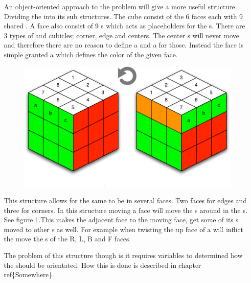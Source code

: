 An object-oriented approach to the problem will give a more useful structure. 
Dividing the \rubik{} into its sub structures. 
The cube consist of the 6 faces each with 9 shared \cpiece{}. 
A face also consist of 9 \cubicle{}s which acts as placeholders for the \cpiece{}s. 
There are 3 types of \cpiece{} and cubicles; corner, edge and centers. 
The center \cpiece{}s will never move and therefore there are no reason to define a \cubicle{} and a \cpiece{} for those. Instead the face is simple granted a \facelet{} which defines the color of the given face.
\begin{figure}[h]
	\centering
		\includegraphics[scale=0.7]{input/pics/twistOfUpFace.pdf}
	\caption{}
	\label{fig:twistOfUpFace}
\end{figure}
This structure allows for the same \cubicle{} to be in several faces. 
Two faces for edges and three for corners. 
In this structure moving a face will move the \cpiece{}s around in the \cubicle{}s. See figure \ref{fig:twistOfUpFace}.This makes the adjacent face to the moving face, get some of its \cpiece{}s moved to other \cubicle{}s as well. 
For example when twisting the up face of a \rubik{} will inflict the move the \cpiece{}s of the R, L, B and F faces. 

The problem of this structure though is it requires variables to determined how the \facelet{} should be orientated. 
How this is done is described in chapter ref\{Somewhere\}.
